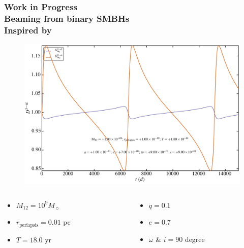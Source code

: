 \documentclass[hyperref={pdfpagelabels=false}]{beamer}
\begin{document}
\begin{frame}
\frametitle{Work in Progress\\Beaming from binary SMBHs\\{\tiny Inspired by \citet*{binarySMBHNature15}}}
        \begin{figure}
          \includegraphics[scale=0.05]{images/beamingFactor.jpg}
        \end{figure}
  \begin{columns}
  \centering
    \begin{column}{0.5\textwidth}
      \begin{itemize}
        \item $M_{12} = 10^{9} M_{\sun}$
        \item $r_{\mathrm{periapsis}} = 0.01$ pc
        \item $T = 18.0$ yr
      \end{itemize}
    \end{column}
    \begin{column}{0.5\textwidth}
      \begin{itemize}
        \item $q = 0.1$
        \item $e = 0.7$
        \item $\omega$ \& $i = 90$ degree
      \end{itemize}
    \end{column}
  \end{columns}
\end{frame}
\end{document}
